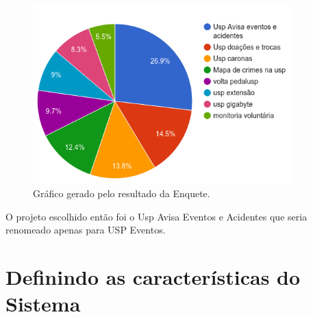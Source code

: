 \begin{figure}[htb]
\includegraphics[width=10cm]{figuras/poll_chart}
\caption{\label{fig:poll_chart} Gráfico gerado pelo resultado da Enquete.}
\end{figure}
\par O projeto escolhido então foi o Usp Avisa Eventos e Acidentes que seria renomeado apenas para USP Eventos.
\section{Definindo as características do Sistema}
